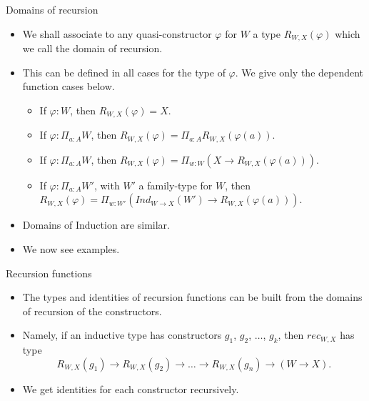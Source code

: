 \documentclass[10 pt., handout]{beamer}
\theoremstyle{plain}
\theoremstyle{remark}
\begin{document}
\begin{frame}{Domains of recursion}

\begin{itemize}

\item We shall associate to any quasi-constructor $\varphi$ for $W$ a type $R_{W, X}(\varphi)$ which we call the domain of recursion. 
\item This can be defined in all cases for the type of $\varphi$. We give only the dependent function cases below.
\begin{itemize}
\item If $\varphi : W$, then $R_{W, X}(\varphi) = X$.
\item If $\varphi : \Pi_{a : A} W$, then $R_{W, X}(\varphi) = \Pi_{a : A} R_{W, X}(\varphi(a))$.
\item If $\varphi : \Pi_{a : A} W$, then $R_{W, X}(\varphi) = \Pi_{w : W} (X \to R_{W, X}(\varphi(a)))$.
\item If $\varphi : \Pi_{a : A} W'$, with $W'$ a family-type for $W$, then $R_{W, X}(\varphi) = \Pi_{w : W'} (Ind_{W \to X}(W') \to R_{W, X}(\varphi(a)))$.
\end{itemize}

\item Domains of Induction are similar.

\item We now see examples.

\end{itemize}

\end{frame}


\begin{frame}{Recursion functions}

\begin{itemize}

\item The types and identities of recursion functions can be built from the domains of recursion of the constructors.

\item Namely, if an inductive type has constructors $g_1$, $g_2$, $\dots$, $g_k$, then $rec_{W, X}$ has type 
$$R_{W, X}(g_1) \to R_{W, X}(g_2) \to \dots \to R_{W, X}(g_n) \to (W \to X).$$

\item We get identities for each constructor recursively.

\end{itemize}

\end{frame}
\end{document}
